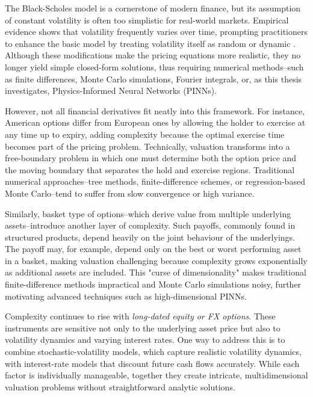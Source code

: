 \documentclass[12pt]{report} %
\theoremstyle{plain} %
\theoremstyle{definition} %
\theoremstyle{remark} %
\begin{document}
The Black-Scholes model is a cornerstone of modern finance, but its assumption of constant
volatility is often too simplistic for real-world markets. Empirical evidence shows that volatility
frequently varies over time, prompting practitioners to enhance the basic model by treating
volatility itself as random or dynamic \cite{hestonmodel}. Although these modifications make the
pricing equations more realistic, they no longer yield simple closed-form solutions, thus
requiring numerical methods--such as finite differences, Monte Carlo simulations, Fourier
integrals, or, as this thesis investigates, Physics-Informed Neural Networks (PINNs).

However, not all financial derivatives fit neatly into this framework. For instance, American
options differ from European ones by allowing the holder to exercise at any time up to expiry,
adding complexity because the optimal exercise time becomes part of the pricing problem.
Technically, valuation transforms into a free-boundary problem in which one must determine both the
option price and the moving boundary that separates the hold and exercise regions. Traditional
numerical approaches--tree methods, finite-difference schemes, or regression-based Monte
Carlo--tend to suffer from slow convergence or high variance.

Similarly, basket type of options--which derive value from multiple underlying assets--introduce another
layer of complexity. Such payoffs, commonly found in structured products, depend heavily on the
joint behaviour of the underlyings. The payoff may, for example, depend only on the
best or worst performing asset in a basket, making valuation challenging because complexity grows
exponentially as additional assets are included. This "curse of dimensionality" makes traditional
finite-difference methods impractical and Monte Carlo simulations noisy, further motivating
advanced techniques such as high-dimensional PINNs.

Complexity continues to rise with \emph{long-dated equity or FX options}. These instruments 
are sensitive not only to the underlying asset price but also to volatility dynamics and varying 
interest rates. One way to address this is to combine stochastic-volatility models, which capture 
realistic volatility dynamics, with interest-rate models that discount future cash flows accurately. While 
each factor is individually manageable, together they create intricate, multidimensional valuation 
problems without straightforward analytic solutions.
\end{document}
